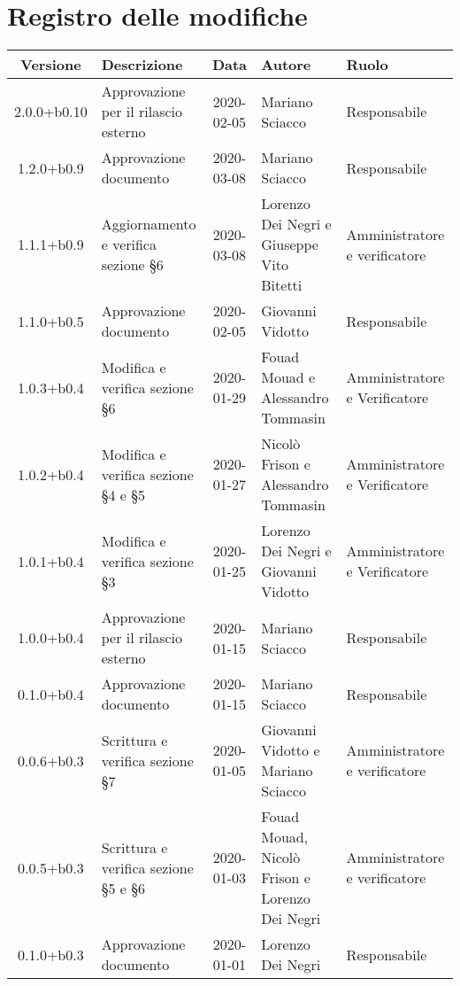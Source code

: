 \section*{Registro delle modifiche}

\begin{center}
	\begin{longtable}{|c|p{3.5cm}|c|p{3cm}|p{3cm}|}
	\hline
	\rowcolor{lighter-grayer}
	\textbf{Versione} & \textbf{Descrizione} & \textbf{Data} & \textbf{Autore} & \textbf{Ruolo} \\
	\hline
	\endfirsthead

	2.0.0+b0.10 & Approvazione per il rilascio esterno & 2020-02-05 & Mariano Sciacco & Responsabile \\
	\hline
	1.2.0+b0.9 & Approvazione documento & 2020-03-08 & Mariano Sciacco & Responsabile \\
	\hline
	1.1.1+b0.9 & Aggiornamento e verifica sezione \S6  & 2020-03-08 & Lorenzo Dei Negri e Giuseppe Vito Bitetti & Amministratore e verificatore \\
	\hline
	1.1.0+b0.5 & Approvazione documento & 2020-02-05 & Giovanni Vidotto & Responsabile \\
	\hline 
	1.0.3+b0.4 & Modifica e verifica sezione \S6 & 2020-01-29 & Fouad Mouad e Alessandro Tommasin & Amministratore e Verificatore \\
	\hline
	1.0.2+b0.4 & Modifica e verifica sezione \S4 e \S5 & 2020-01-27 & Nicolò Frison e Alessandro Tommasin & Amministratore e Verificatore \\
	\hline
	1.0.1+b0.4 & Modifica e verifica sezione \S3 & 2020-01-25 & Lorenzo Dei Negri e Giovanni Vidotto & Amministratore e Verificatore \\
	\hline
	1.0.0+b0.4 & Approvazione per il rilascio esterno & 2020-01-15 & Mariano Sciacco & Responsabile \\
	\hline
	0.1.0+b0.4 & Approvazione documento & 2020-01-15 & Mariano Sciacco & Responsabile \\
	\hline 
	0.0.6+b0.3 & Scrittura e verifica sezione \S7  & 2020-01-05 & Giovanni Vidotto e Mariano Sciacco & Amministratore e verificatore \\
	\hline 
	0.0.5+b0.3 & Scrittura e verifica sezione \S5 e \S6  & 2020-01-03 & Fouad Mouad, Nicolò Frison e Lorenzo Dei Negri & Amministratore e verificatore \\
	\hline
	0.1.0+b0.3 & Approvazione documento & 2020-01-01 & Lorenzo Dei Negri & Responsabile \\ 

\end{longtable}
\end{center}
